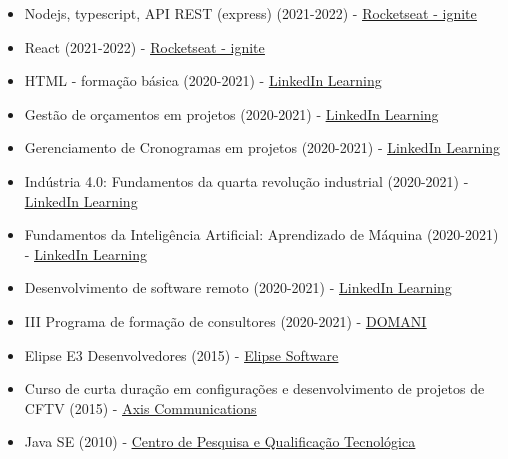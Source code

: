 \documentclass[11pt,a4paper,sans]{moderncv}
\begin{document}
\begin{samepage}
{\begin{itemize}[itemsep=0cm, label=\textbullet]
		  \item Nodejs, typescript, API REST (express) (2021-2022) - \underline{\color{blue}\href{https://rocketseat.com.br}{Rocketseat - ignite}}
		  \item React (2021-2022) - \underline{\color{blue}\href{https://rocketseat.com.br}{Rocketseat - ignite}}
		  \item HTML - formação básica (2020-2021) - \underline{\color{blue}\href{https://linkedin.com/learning}{LinkedIn Learning}}
		  \item Gestão de orçamentos em projetos (2020-2021) - \underline{\color{blue}\href{https://linkedin.com/learning}{LinkedIn Learning}}
		  \item Gerenciamento de Cronogramas em projetos (2020-2021) - \underline{\color{blue}\href{https://linkedin.com/learning}{LinkedIn Learning}}
		  \item Indústria 4.0: Fundamentos da quarta revolução industrial (2020-2021) - \underline{\color{blue}\href{https://linkedin.com/learning}{LinkedIn Learning}}
		  \item Fundamentos da Inteligência Artificial: Aprendizado de Máquina (2020-2021) - \underline{\color{blue}\href{https://linkedin.com/learning}{LinkedIn Learning}}
		  \item Desenvolvimento de software remoto (2020-2021) - \underline{\color{blue}\href{https://linkedin.com/learning}{LinkedIn Learning}}
		  \item III Programa de formação de consultores (2020-2021) - \underline{\color{blue}\href{https://domani.com.br}{DOMANI}}
		  \item Elipse E3 Desenvolvedores (2015) - \underline{\color{blue}\href{https://elipse.com}{Elipse Software}}
		  \item Curso de curta duração em configurações e desenvolvimento de projetos de CFTV (2015) - \underline{\color{blue}\href{https://axis.com}{Axis Communications}}
		  \item Java SE (2010) - \underline{\color{blue}\href{https://cpqt.com.br}{Centro de Pesquisa e Qualificação Tecnológica}}
	  \end{itemize}}
\end{samepage}
\end{document}
